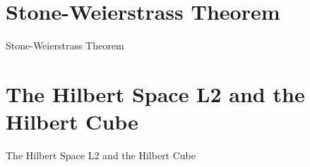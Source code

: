\section{Stone-Weierstrass Theorem}
\label{sec:stone-weierstrass-theorem}

Stone-Weierstrass Theorem

\section{The Hilbert Space L2 and the Hilbert Cube}
\label{sec:the-hilbert-space-l2-and-the-hilbert-cube}

The Hilbert Space L2 and the Hilbert Cube
